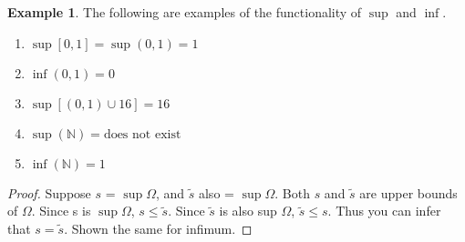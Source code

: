 \documentclass[a4paper, notitlepage]{report}
\newtheorem{theorem}{Theorem}
\theoremstyle{remark}
\theoremstyle{definition}
\newtheorem{example}{Example}
\begin{document}
	    \begin{example}
	      The following are examples of the functionality of \( \sup \) and
	      \( \inf \).
	      \begin{enumerate}
		\item \( \sup[0,1]  = \sup(0,1) = 1 \)
		\item \(\inf(0,1) = 0\)
		\item \(\sup[(0,1) \cup {16}] = 16\)
		\item \(\sup(\mathbb{N}) = \text{does not exist}\)
		\item \(\inf(\mathbb{N}) = 1\)
	      \end{enumerate}
	    \end{example}
            \begin{proof}
                Suppose $s$ = $\sup \Omega$, and $\tilde{s}$ also = $\sup \Omega$. Both $s$ and $\tilde{s}$ are upper bounds of $\Omega$. Since s is $\sup \Omega$, $s \leq \tilde{s}$. Since $\tilde{s}$ is also sup $\Omega$, $\tilde{s} \leq s$. 
                Thus you can infer that $s = \tilde{s}$. Shown the same for infimum.
            \end{proof}
	    \begin{center}
	    \end{center}
	    
\end{document}
